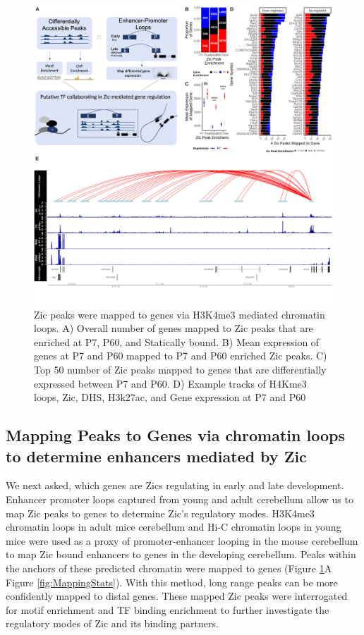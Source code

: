\documentclass[fleqn,10pt,twocolumn]{wlscirep}
\begin{document}
\begin{figure}[!ht]
\includegraphics[width=.95\textwidth]{../figures/figure3.png}
\caption{Zic peaks were mapped to genes via H3K4me3 mediated chromatin loops. A) Overall number of genes mapped to Zic peaks that are enriched at P7, P60, and Statically bound. B) Mean expression of genes at P7 and P60 mapped to P7 and P60 enriched Zic peaks. C) Top 50 number of Zic peaks mapped to genes that are differentially expressed between P7 and P60. D) Example tracks of H4Kme3 loops, Zic, DHS, H3k27ac, and Gene expression at P7 and P60}
\label{fig:PeakMapping}
\end{figure}

\subsection*{Mapping Peaks to Genes via chromatin loops to determine enhancers mediated by Zic}
We next asked, which genes are Zics regulating in early and late development. Enhancer promoter loops captured from young and adult cerebellum allow us to map Zic peaks to genes to determine Zic's regulatory modes. H3K4me3 chromatin loops in adult mice cerebellum \cite{Yamada2019SensoryLearning} and Hi-C chromatin loops in young mice \cite{Goodman2020TheBrain}  were used as a proxy of promoter-enhancer looping in the mouse cerebellum  to map Zic bound enhancers to genes in the developing cerebellum. Peaks within the anchors of these predicted chromatin were mapped to genes (Figure \ref{fig:PeakMapping}A Figure \ref{fig:MappingStats}). With this method, long range peaks can be more confidently mapped to distal genes. These mapped Zic peaks were interrogated for motif enrichment and TF binding enrichment to further investigate the regulatory modes of Zic and its binding partners. 
\end{document}
